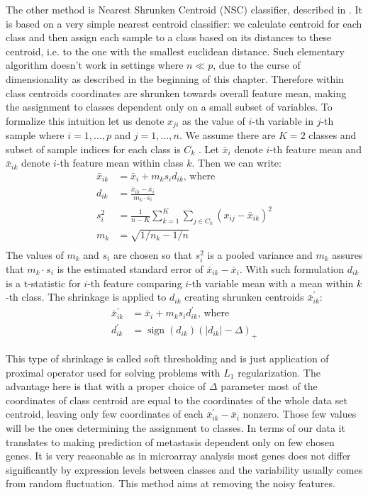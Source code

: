 \documentclass[shortabstract, english, mgr]{iithesis}
\begin{document}
The other method is Nearest Shrunken Centroid (NSC) classifier, described in \cite{NSC}. It is based on a very simple nearest centroid classifier: we calculate centroid for each class and then assign each sample to a class based on its distances to these centroid, i.e. to the one with the smallest euclidean distance. Such elementary algorithm doesn't work in settings where $n \ll p$, due to the curse of dimensionality as described in the beginning of this chapter. Therefore within class centroids coordinates are shrunken towards overall feature mean, making the assignment to classes dependent only on a small subset of variables. To formalize this intuition let us denote $x_{ji}$ as the value of $i$-th variable in $j$-th sample where $i=1, \ldots, p$ and $j=1,\ldots,n$. We assume there are $K=2$ classes and subset of sample indices for each class is $C_k$ . Let $\bar{x}_i$ denote $i$-th feature mean and $\bar{x}_{ik}$ denote $i$-th feature mean within class $k$. Then we can write:
\begin{align*}
    \bar{x}_{i k}&=\bar{x}_{i}+m_{k} s_{i} d_{i k} \text{, where} \\
    d_{i k}&=\frac{\bar{x}_{i k}-\bar{x}_{i}}{m_{k} \cdot s_{i}} \\ 
    s_{i}^{2}&=\frac{1}{n-K} \sum_{k=1}^{K} \sum_{j \in C_{k}}\left(x_{i j}-\bar{x}_{i k}\right)^{2} \\
    m_{k}&=\sqrt{1 / n_{k}-1 / n} \\
\end{align*}
The values of $m_k$ and $s_i$ are chosen so that $s_i^2$ is a pooled variance and $m_k$ assures that $m_k \cdot s_i$ is the estimated standard error of $\bar{x}_{i k}-\bar{x}_{i}$. With such formulation $d_{ik}$ is a t-statistic for $i$-th feature comparing $i$-th variable mean with a mean within $k$-th class. The shrinkage is applied to $d_{ik}$ creating shrunken centroids $\bar{x}_{ik}^{\prime}$:
\begin{align*}
    \bar{x}_{i k}^{\prime}&=\bar{x}_{i}+m_{k} s_{i} d_{i k}^{\prime} \text{, where} \\
    d_{i k}^{\prime}&=\operatorname{sign}\left(d_{i k}\right)\left(\left|d_{i k}\right|-\Delta\right)_{+}
\end{align*}

This type of shrinkage is called soft thresholding and is just application of proximal operator used for solving problems with $L_1$ regularization. The advantage here is that with a proper choice of $\Delta$ parameter most of the coordinates of class centroid are equal to the coordinates of the whole data set centroid, leaving only few coordinates of each $\bar{x}_{i k}^{\prime} - \bar{x}_{i}$ nonzero. Those few values will be the ones determining the assignment to classes. In terms of our data it translates to making prediction of metastasis dependent only on few chosen genes. It is very reasonable as in microarray analysis most genes does not differ significantly by expression levels between classes and the variability usually comes from random fluctuation. This method aims at removing the noisy features.
\end{document}
